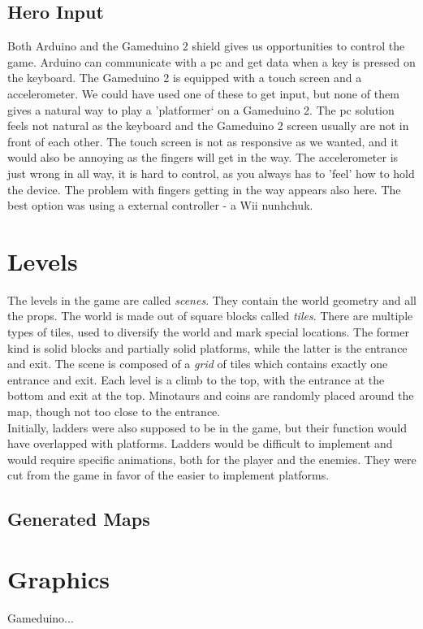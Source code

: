 \subsection{Hero Input}
Both Arduino and the Gameduino 2 shield gives us opportunities to control the game. Arduino can communicate with a pc and get data when a key is pressed on the keyboard. The Gameduino 2 is equipped with a touch screen and a accelerometer. We could have used one of these to get input, but none of them gives a natural way to play a 'platformer` on a Gameduino 2. The pc solution feels not natural as the keyboard and the Gameduino 2 screen usually are not in front of each other. The touch screen is not as responsive as we wanted, and it would also be annoying as the fingers will get in the way. The accelerometer is just wrong in all way, it is hard to control, as you always has to 'feel' how to hold the device. The problem with fingers getting in the way appears also here. The best option was using a external controller - a Wii nunhchuk.

\section{Levels} %
The levels in the game are called \emph{scenes}. They contain the world geometry and all the props. The world is made out of square blocks called \emph{tiles}. There are multiple types of tiles, used to diversify the world and mark special locations. The former kind is solid blocks and partially solid platforms, while the latter is the entrance and exit. The scene is composed of a \emph{grid} of tiles which contains exactly one entrance and exit. Each level is a climb to the top, with the entrance at the bottom and exit at the top. Minotaurs and coins are randomly placed around the map, though not too close to the entrance.\\
Initially, ladders were also supposed to be in the game, but their function would have overlapped with platforms. Ladders would be difficult to implement and would require specific animations, both for the player and the enemies. They were cut from the game in favor of the easier to implement platforms.

\subsection{Generated Maps}


\section{Graphics}
Gameduino...

